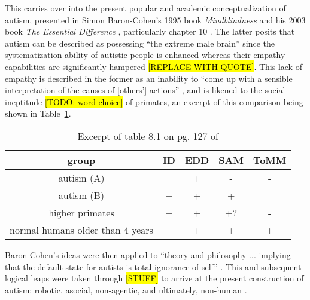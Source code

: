 \documentclass[letterpaper]{article}
\begin{document}

This carries over into the present popular and academic conceptualization of autism, presented in Simon Baron-Cohen's 1995 book \textit{Mindblindness} \cite{mb} and his 2003 book \textit{The Essential Difference} \cite{diff}, particularly chapter 10 \cite[p.~12]{auto}. The latter posits that autism can be described as possessing “the extreme male brain” since the systematization ability of autistic people is enhanced whereas their empathy capabilities are significantly hampered \hl{[REPLACE WITH QUOTE]}. This lack of empathy is described in the former as an inability to “come up with a sensible interpretation of the causes of [others'] actions” \cite[p.~4]{mb}, and is likened to the social ineptitude \hl{[TODO: word choice]} of primates, an excerpt of this comparison being shown in Table~\ref{tab:mb}.

\begin{table}[h]
    \centering
    \begin{tabular}{c|cccc}
        group & ID & EDD & SAM & ToMM\\
        \hline
        autism (A) & + & + & - & -\\
        autism (B) & + & + & + & -\\
        higher primates & + & + & +? & -\\
        normal humans older than 4 years & + & + & + & +\\
    \end{tabular}
    \caption{Excerpt of table 8.1 on pg. 127 of \cite{mb}}\label{tab:mb}
\end{table}

Baron-Cohen's ideas were then applied to “theory and philosophy ... implying that the default state for autists is total ignorance of self” \cite[p.~13]{auto}. This and subsequent logical leaps were taken through \hl{[STUFF]} to arrive at the present construction of autism: robotic, asocial, non-agentic, and ultimately, non-human \cite[pp.~14-5]{auto}.
\end{document}

